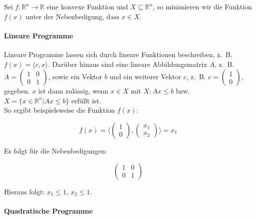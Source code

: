 \begin{Def}
Sei $f: \mathbb{R}^{n} \rightarrow \mathbb{R}$ eine konvexe Funktion und $X \subseteq \mathbb{R}^{n}$, so minimieren wir die Funktion $f(x)$ unter der Nebenbedigung, dass $x \in X$.
\end{Def}


\paragraph{Lineare Programme}

Lineare Programme lassen sich durch lineare Funktionen beschreiben, z.~B. $f(x) = \langle c, x \rangle$. Darüber hinaus sind eine lineare Abbildungsmatrix $A$, z.~B. $A = \begin{pmatrix}1 & 0 \\ 0 & 1 \end{pmatrix}$, sowie ein Vektor $b$ und ein weiterer Vektor $c$, z.~B. $c = \begin{pmatrix}1 \\ 0 \end{pmatrix}$, gegeben. $x$ ist dann zulässig, wenn $x \in X$ mit $X: Ax \le b$ bzw. $X = \{x \in \mathbb{R}^{n} | Ax \le b\}$ erfüllt ist. \\
So ergibt beispielsweise die Funktion $f(x)$:

\begin{equation*}
f(x) = \langle \begin{pmatrix}1 \\ 0 \end{pmatrix}, \begin{pmatrix}x_{1} \\ x_{2} \end{pmatrix} \rangle = x_{1}
\end{equation*}

Es folgt für die Nebenbedigungen:

\begin{equation*}
\begin{pmatrix}1 & 0 \\ 0 & 1 \end{pmatrix}
\end{equation*}

Hieraus folgt: $x_{1} \le 1$, $x_{2} \le 1$.

\paragraph{Quadratische Programme}

